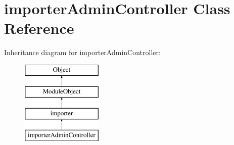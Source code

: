 \hypertarget{classimporterAdminController}{\section{importer\-Admin\-Controller Class Reference}
\label{classimporterAdminController}
}
Inheritance diagram for importer\-Admin\-Controller\-:\begin{figure}[H]
\begin{center}
\leavevmode
\includegraphics[height=4.000000cm]{classimporterAdminController}
\end{center}
\end{figure}
